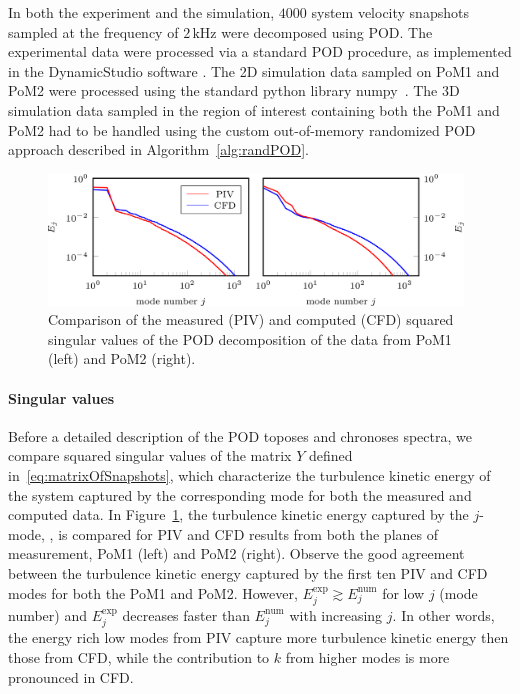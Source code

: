 In both the experiment and the simulation, $4000$ system velocity snapshots sampled at the frequency of $2\,\mathrm{kHz}$ were decomposed using POD. The experimental data were processed via a standard POD procedure{, as} implemented in the DynamicStudio software \cite{dynamicsStudio}. The 2D simulation data {sampled on PoM1 and PoM2} were processed using {the} standard python library numpy~\cite{numpy}. {The} 3D simulation data {sampled in the region of interest  containing both the PoM1 and PoM2} had to be handled using {the custom} {out-of-memory} randomized POD approach described in Algorithm~\ref{alg:randPOD}.

\begin{figure}[htbp]
    \centering
    \includegraphics[width=0.98\textwidth]{02_images/00_export/figure9.png}
    \caption{Comparison of the measured (PIV) and computed (CFD) squared singular values of the POD decomposition of the data from PoM1 (left) and PoM2 (right).}
    \label{fig:singVals}
\end{figure}

\paragraph{Singular values}
Before a detailed description of the POD toposes  and chronoses  spectra, we compare squared singular values of the matrix $Y$ defined in~\eqref{eq:matrixOfSnapshots}, which characterize the turbulence kinetic energy of the system captured by {the} corresponding mode for both the measured and computed data. In Figure~\ref{fig:singVals}, the turbulence kinetic energy captured by {the} $j$-mode, , is compared for PIV and CFD results from both {the} planes of measurement{,} PoM1 (left) and PoM2 (right). Observe the good agreement between the turbulence kinetic energy captured by the first ten PIV and CFD modes {for both the PoM1 and PoM2}. However, $E_{j}^{\mathrm{exp}} \gtrsim E_{j}^{\mathrm{num}}$ for low $j$ (mode number) and $E_{j}^{\mathrm{exp}}$ decreases faster than $E_{j}^{\mathrm{num}}$ with increasing $j$. In other words, the energy rich low modes from PIV capture more turbulence kinetic energy then those from CFD, while the contribution to $k$ from higher modes is more pronounced in CFD.

